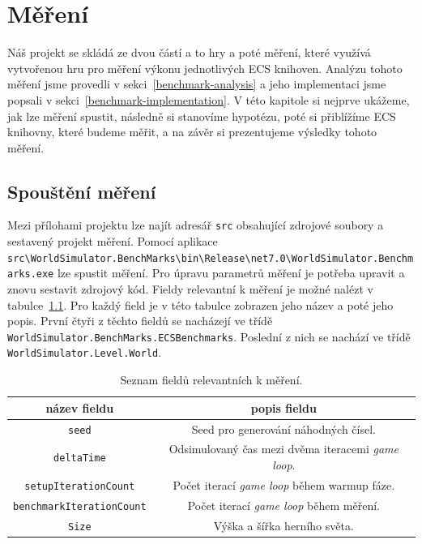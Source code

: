 \chapter{Měření}
\label{chap:benchmark}
Náš projekt se skládá ze dvou částí a to hry a poté měření, které využívá vytvořenou hru pro měření výkonu jednotlivých ECS knihoven. Analýzu tohoto měření jsme provedli v sekci~\ref{benchmark-analysis} a jeho implementaci jsme popsali v sekci~\ref{benchmark-implementation}. V této kapitole si nejprve ukážeme, jak lze měření spustit, následně si stanovíme hypotézu, poté si přiblížíme ECS knihovny, které budeme měřit, a na závěr si prezentujeme výsledky tohoto měření.

\section{Spouštění měření}
Mezi přílohami projektu lze najít adresář \texttt{src} obsahující zdrojové soubory a sestavený projekt měření. Pomocí aplikace \texttt{src\textbackslash WorldSimulator.BenchMarks\textbackslash bin\textbackslash Release\textbackslash net7.0\textbackslash WorldSimulator.Benchmarks.exe} lze spustit měření. Pro úpravu parametrů měření je potřeba upravit a znovu sestavit zdrojový kód. Fieldy relevantní k měření je možné nalézt v tabulce~\ref{tab:benchmark-relevant-fields}. Pro každý field je v této tabulce zobrazen jeho název a poté jeho popis. První čtyři z těchto fieldů se nacházejí ve třídě \texttt{WorldSimulator.BenchMarks.ECSBenchmarks}. Poslední z nich se nachází ve třídě \texttt{WorldSimulator.Level.World}.

\begin{table}[!htb]
    \centering\footnotesize\sf
    \begin{tabular}{c c}
        \toprule
        název fieldu & popis fieldu \\
        \midrule

        \texttt{seed} & Seed pro generování náhodných čísel. \\

        \texttt{deltaTime} & Odsimulovaný čas mezi dvěma iteracemi \textit{game loop}. \\

        \texttt{setupIterationCount} & Počet iterací \textit{game loop} během warmup fáze. \\

        \texttt{benchmarkIterationCount} & Počet iterací \textit{game loop} během měření. \\

        \texttt{Size} & Výška a šířka herního světa. \\
        \bottomrule
    \end{tabular}
    \caption{Seznam fieldů relevantních k měření.}
    \label{tab:benchmark-relevant-fields}
\end{table}

